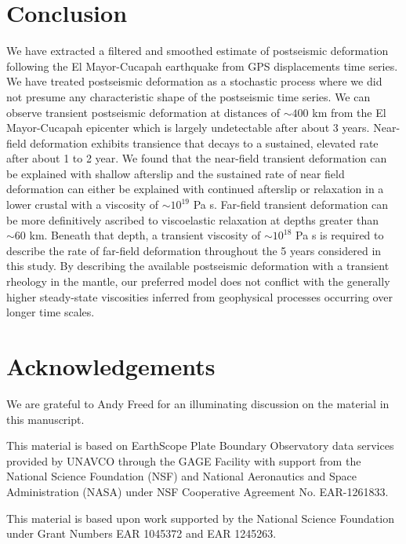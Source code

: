 \documentclass[review]{elsarticle}
\begin{document}
\section{Conclusion}

We have extracted a filtered and smoothed estimate of postseismic deformation following the El Mayor-Cucapah earthquake from GPS displacements time series.  We have treated postseismic deformation as a stochastic process where we did not presume any characteristic shape of the postseismic time series.  We can observe transient postseismic deformation at distances of $\sim400$ km from the El Mayor-Cucapah epicenter which is largely undetectable after about 3 years. Near-field deformation exhibits transience that decays to a sustained, elevated rate after about 1 to 2 year.  We found that the near-field transient deformation can be explained with shallow afterslip and the sustained rate of near field deformation can either be explained with continued afterslip or relaxation in a lower crustal with a viscosity of $\sim10^{19}$ Pa s.  Far-field transient deformation can be more definitively ascribed to viscoelastic relaxation at depths greater than $\sim60$ km. Beneath that depth, a transient viscosity of $\sim10^{18}$ Pa s is required to describe the rate of far-field deformation throughout the 5 years considered in this study.  By describing the available postseismic deformation with a transient rheology in the mantle, our preferred model does not conflict with the generally higher steady-state viscosities inferred from geophysical processes occurring over longer time scales.

\section*{Acknowledgements}
We are grateful to Andy Freed for an illuminating discussion on the material in this manuscript.  
 
This material is based on EarthScope Plate Boundary Observatory data services provided by UNAVCO through the GAGE Facility with support from the National Science Foundation (NSF) and National Aeronautics and Space Administration (NASA) under NSF Cooperative Agreement No. EAR-1261833.

This material is based upon work supported by the National Science
Foundation under Grant Numbers EAR 1045372 and EAR 1245263.








 


 

 
\end{document}
